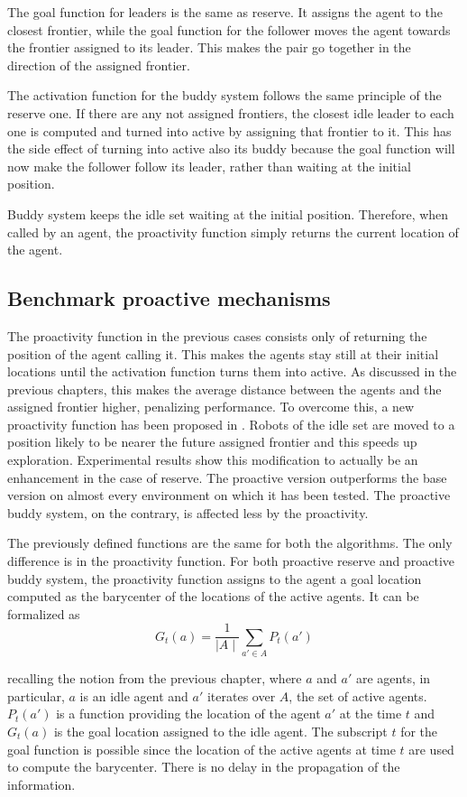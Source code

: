 The goal function for leaders is the same as reserve. It assigns the
agent to the closest frontier, while the goal function for the follower
moves the agent towards the frontier assigned to its leader. This
makes the pair go together in the direction of the assigned frontier.

The activation function for the buddy system follows the same principle
of the reserve one. If there are any not assigned frontiers, the closest
idle leader to each one is computed and turned into active by assigning
that frontier to it. This has the side effect of turning into active
also its buddy because the goal function will now make the follower
follow its leader, rather than waiting at the initial position. 

Buddy system keeps the idle set waiting at the initial position. Therefore,
when called by an agent, the proactivity function simply returns the
current location of the agent. 

\subsection{Benchmark proactive mechanisms}

The proactivity function in the previous cases consists only of returning
the position of the agent calling it. This makes the agents stay still
at their initial locations until the activation function turns them
into active. As discussed in the previous chapters, this makes the
average distance between the agents and the assigned frontier higher,
penalizing performance. To overcome this, a new proactivity function
has been proposed in \cite{Cattaneo2017}. Robots of the idle set are moved
to a position likely to be nearer the future assigned frontier and
this speeds up exploration. Experimental results show this modification
to actually be an enhancement in the case of reserve. The proactive
version outperforms the base version on almost every environment on
which it has been tested. The proactive buddy system, on the contrary,
is affected less by the proactivity. 

The previously defined functions are the same for both the algorithms.
The only difference is in the proactivity function. For both proactive
reserve and proactive buddy system, the proactivity function assigns
to the agent a goal location computed as the barycenter of the locations
of the active agents. It can be formalized as 
\[
G_{t}(a)=\frac{1}{\mid A\mid}\sum_{a'\in A}P_{t}(a')
\]

recalling the notion from the previous chapter, where $a$ and $a'$
are agents, in particular, $a$ is an idle agent and $a'$ iterates
over $A$, the set of active agents. $P_{t}\left(a'\right)$ is a
function providing the location of the agent $a'$ at the time $t$
and $G_{t}\left(a\right)$ is the goal location assigned to the idle
agent. The subscript $t$ for the goal function is possible since
the location of the active agents at time $t$ are used to compute
the barycenter. There is no delay in the propagation of the information. 


